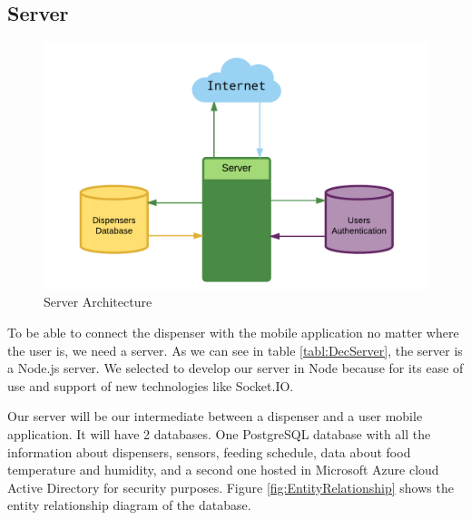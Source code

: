 \documentclass[12pt]{article}
\begin{document}
\subsection{Server}

\begin{figure}[!htb]
  \includegraphics[width=\textwidth]{Figures/ArchitectureServer}
  \caption{Server Architecture}
  \label{fig:ServArchitecture}
\end{figure}

To be able to connect the dispenser with the mobile application no matter where the user is, we need a server. As we can see in table \ref{tabl:DecServer}, the server is a Node.js server. We selected to develop our server in Node because for its ease of use and support of new technologies like Socket.IO.

Our server will be our intermediate between a dispenser and a user mobile application. It will have 2 databases. One PostgreSQL database with all the information about dispensers, sensors, feeding schedule, data about food temperature and humidity, and a second one hosted in Microsoft Azure cloud Active Directory for security purposes. Figure \ref{fig:EntityRelationship} shows the entity relationship diagram of the database.
\end{document}
